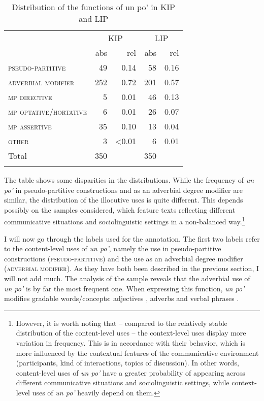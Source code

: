 \begin{table}[h]
\begin{tabularx}{0.8\textwidth}{Xrr@{\qquad}rr}
\lsptoprule
 & \multicolumn{2}{c}{KIP } & \multicolumn{2}{c}{LIP} \\
 \cmidrule(lr){2-3}\cmidrule(lr){4-5}
 & abs & rel & abs & rel\\
 \midrule
\textsc{pseudo-partitive} & 49 & {0.14} & 58 & {0.16}\\
\textsc{adverbial} \textsc{modifier} & 252 & {0.72} & 201 & {0.57}\\
\textsc{mp} \textsc{directive} & 5 & {0.01} & 46 & {0.13}\\
\textsc{mp} \textsc{optative/hortative} & 6 & {0.01} & 26 & {0.07}\\
\textsc{mp} \textsc{assertive} & 35 & {0.10} & 13 & {0.04}\\
\textsc{other} & 3 & {<0.01} & 6 & {0.01}\\
\midrule
Total & 350 &  & 350 & \\
\lspbottomrule
\end{tabularx}
\caption{\label{tab:key:7.1} Distribution of the functions of {un po’} in KIP and LIP}
\end{table}

\clearpage



The table shows some disparities in the distributions. While the frequency of \textit{un po’} in pseudo-partitive constructions and as an adverbial degree modifier are similar, the distribution of the illocutive uses is quite different. This depends possibly on the samples considered, which feature texts reflecting different communicative situations and sociolinguistic settings in a non-balanced way.\footnote{However, it is worth noting that – compared to the relatively stable distribution of the content-level uses – the context-level uses display more variation in frequency. This is in accordance with their behavior, which is more influenced by the contextual features of the communicative environment (participants, kind of interactions, topics of discussion). In other words, content-level uses of \textit{un po’} have a greater probability of appearing across different communicative situations and sociolinguistic settings, while context-level uses of \textit{un po’} heavily depend on them.}

I will now go through the labels used for the annotation. The first two labels refer to the content-level uses of \textit{un po’}, namely the use in pseudo-partitive constructions (\textsc{pseudo-partitive}) and the use as an adverbial degree modifier (\textsc{adverbial} \textsc{modifier}). As they have both been described in the previous section, I will not add much. The analysis of the sample reveals that the adverbial use of \textit{un po’} is by far the most frequent one. When expressing this function, \textit{un po’} modifies gradable words/concepts: adjectives , adverbs  and verbal phrases .

